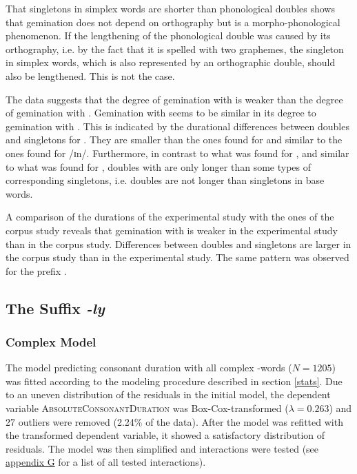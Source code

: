That singletons in simplex words are shorter than phonological doubles shows that gemination does not depend on orthography but is a morpho-phonological phenomenon. If the lengthening of the phonological double was caused by its orthography, i.e. by the fact that it is spelled with two graphemes, the singleton in simplex words, which is also represented by an orthographic double, should also be lengthened. This is not the case. 


The data suggests that the degree of gemination with  is weaker than the degree of gemination with . Gemination with  seems to be similar in its degree to gemination with . 
This is indicated by the durational differences between doubles and singletons for . They are smaller than the ones found for  and similar to the ones found for /ɪn/. 
Furthermore, in contrast to what was found for , and similar to what was found for , doubles with  are only longer than some types of corresponding singletons, i.e. doubles are not longer than singletons in base words.



A comparison of the durations of the experimental study with the ones of the corpus study reveals that gemination with  is weaker in the experimental study than in the corpus study. Differences between doubles and singletons are larger in the corpus study than in the experimental study. The same pattern was observed for the prefix .


\subsection{The Suffix \textit{-ly} }

\subsubsection{Complex Model}

The model predicting consonant duration with all complex -words ($N=1205$) was fitted according to the modeling procedure described in section \ref{stats}. Due to an uneven distribution of the residuals in the initial model, the dependent variable \textsc{AbsoluteConsonantDuration} was Box-Cox-transformed ($\lambda = 0.263$) and 27 outliers were removed (2.24\% of the data). 
After the model was refitted with the transformed dependent variable, it showed a satisfactory distribution of residuals. The model was then simplified and interactions were tested (see \hyperref[Appendix G Summaries of tested interactions in experimental study]{appendix G} for a list of all tested interactions). 

